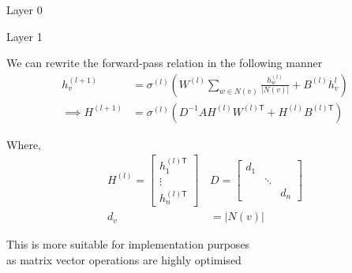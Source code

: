 \documentclass{article}
\begin{document}
			\begin{center}
				Layer 0
			\end{center}
			\begin{center}
				Layer 1
			\end{center}

	We can rewrite the forward-pass relation in the following manner
	\begin{align*}
		h_v^{(l+1)} &= \sigma^{(l)} ( W^{(l)} \sum_{w \in N(v)} \frac{h_w^{(l)}}{|N(v)|} + B^{(l)} h_v^{l}) \\
		\implies H^{(l+1)} &= \sigma^{(l)}( D^{-1} A H^{(l)} W^{(l)\mathsf{T}} + H^{(l)} B^{(l)\mathsf{T}} )
	\end{align*}

	Where,
	\begin{align*}
		H^{(l)} =
		\begin{bmatrix}
			h_1^{(l)\mathsf{T}} \\
			\vdots \\
			h_n^{(l)\mathsf{T}}
		\end{bmatrix} \,&
		D = 
		\begin{bmatrix}
			d_1 & & \\
			& \ddots & \\
			& & d_n
		\end{bmatrix} \\
		d_v &= |N(v)|
	\end{align*}

	This is more suitable for implementation purposes \\
	as matrix vector operations are highly optimised
\end{document}
